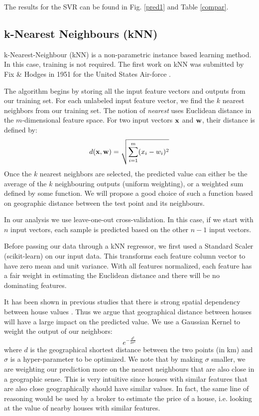 \documentclass[conference]{IEEEtran}
\begin{document}
The results for the SVR can be found in Fig. \ref{pred1} and Table \ref{compar}.

\subsection{k-Nearest Neighbours (kNN)}
k-Nearest-Neighbour (kNN) is a non-parametric instance based learning method. In this case, training is not required. The first work on kNN was submitted by Fix \& Hodges in 1951 for the United States Air-force \cite{fix1951discriminatory}.

The algorithm begins by storing all the input feature vectors and outputs from our training set. For each unlabeled input feature vector, we find the $k$ nearest neighbors from our training set. The notion of \textit{nearest} uses Euclidean distance in the $m$-dimensional feature space. For two input vectors $\bold{x}$ and $\bold{w}$, their distance is defined by:
$$d(\bold{x,w})=\sqrt{\sum_{i=1}^{m}(x_i-w_i)^2}$$
Once the $k$ nearest neighbors are selected, the predicted value can either be the average of the $k$ neighbouring outputs (uniform weighting), or a weighted sum defined by some function. We will propose a good choice of such a function based on geographic distance between the test point and its neighbours.

In our analysis we use leave-one-out cross-validation. In this case, if we start with $n$ input vectors, each sample is predicted based on the other $n-1$ input vectors. 

Before passing our data through a kNN regressor, we first used a Standard Scaler (scikit-learn) on our input data. This transforms each feature column vector to have zero mean and unit variance. With all features normalized, each feature has a fair weight in estimating the Euclidean distance and there will be no dominating features.

It has been shown in previous studies that there is strong spatial dependency between house values \cite{Caplin08machinelearning,SpatialDependence}. Thus we argue that geographical distance between houses will have a large impact on the predicted value. We use a Gaussian Kernel to weight the output of our neighbors:
 $$e^{-\frac{d^2}{2\sigma^2}}$$
where $d$ is the geographical shortest distance between the two points (in km) and $\sigma$ is a hyper-parameter to be optimized. We note that by making $\sigma$ smaller, we are weighting our prediction more on the nearest neighbours that are also close in a geographic sense. This is very intuitive since houses with similar features that are also close geographically should have similar values. In fact, the same line of reasoning would be used by a broker to estimate the price of a house, i.e. looking at the value of nearby houses with similar features.
\end{document}
